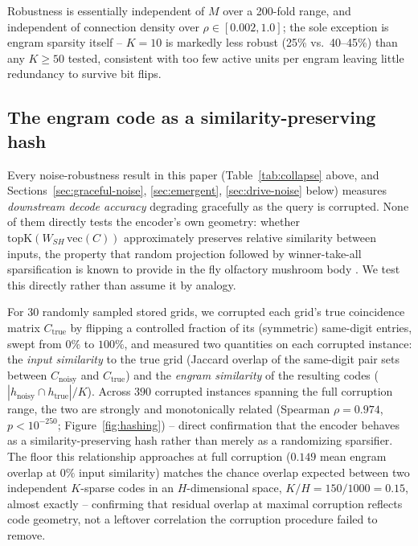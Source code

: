 \documentclass[11pt]{article}
\begin{document}
Robustness is essentially independent of $M$ over a 200-fold range, and independent
of connection density over $\rho\in[0.002,1.0]$; the sole exception is engram sparsity itself
-- $K=10$ is markedly less robust (25\% vs.\ 40--45\%) than any $K\geq 50$ tested, consistent
with too few active units per engram leaving little redundancy to survive bit flips.

\subsection{The engram code as a similarity-preserving hash}
\label{sec:hashing}

Every noise-robustness result in this paper (Table~\ref{tab:collapse} above, and
Sections~\ref{sec:graceful-noise}, \ref{sec:emergent}, \ref{sec:drive-noise} below) measures
\emph{downstream decode accuracy} degrading gracefully as the query is corrupted. None of them
directly tests the encoder's own geometry: whether $\mathrm{topK}(W_{SH}\,\mathrm{vec}(C))$
approximately preserves relative similarity between inputs, the property that random
projection followed by winner-take-all sparsification is known to provide in the fly olfactory
mushroom body \cite{dasgupta2017}. We test this directly rather than assume it by analogy.

For 30 randomly sampled stored grids, we corrupted each grid's true coincidence matrix
$C_{\mathrm{true}}$ by flipping a controlled fraction of its (symmetric) same-digit entries,
swept from $0\%$ to $100\%$, and measured two quantities on each corrupted instance: the
\emph{input similarity} to the true grid (Jaccard overlap of the same-digit pair sets between
$C_{\mathrm{noisy}}$ and $C_{\mathrm{true}}$) and the \emph{engram similarity} of the resulting
codes ($|h_{\mathrm{noisy}}\cap h_{\mathrm{true}}|/K$). Across $390$ corrupted instances
spanning the full corruption range, the two are strongly and monotonically related (Spearman
$\rho=0.974$, $p<10^{-250}$; Figure~\ref{fig:hashing}) -- direct confirmation that the encoder
behaves as a similarity-preserving hash rather than merely as a randomizing sparsifier. The
floor this relationship approaches at full corruption ($0.149$ mean engram overlap at $0\%$
input similarity) matches the chance overlap expected between two independent $K$-sparse codes
in an $H$-dimensional space, $K/H=150/1000=0.15$, almost exactly -- confirming that residual
overlap at maximal corruption reflects code geometry, not a leftover correlation the corruption
procedure failed to remove.
\end{document}
